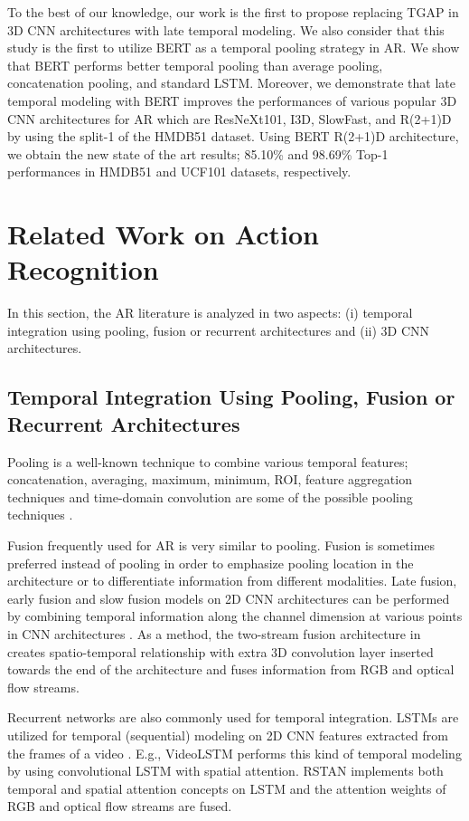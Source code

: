 \documentclass[runningheads]{llncs}
\begin{document}
To the best of our knowledge, our work is the first to propose replacing TGAP in 3D CNN architectures with late temporal modeling. We also consider that this study is the first to utilize BERT as a temporal pooling strategy in AR. We show that BERT performs better temporal pooling than average pooling, concatenation pooling, and standard LSTM. Moreover, we demonstrate that late temporal modeling with BERT improves the performances of various popular 3D CNN architectures for AR which are ResNeXt101, I3D, SlowFast, and R(2+1)D by using the split-1 of the HMDB51 dataset. Using BERT R(2+1)D architecture, we obtain the new state of the art results; 85.10\% and 98.69\% Top-1 performances in HMDB51 and UCF101 datasets, respectively. 
 \section{Related Work on Action Recognition}
In this section, the AR literature is analyzed in two aspects: (i) temporal integration using pooling, fusion or recurrent architectures and (ii) 3D CNN architectures. 
\label{sec:related_work}
\subsection{Temporal Integration Using Pooling, Fusion or Recurrent Architectures}
\label{sec:intro_latePool}
Pooling is a well-known technique to combine various temporal features; concatenation, averaging, maximum, minimum, ROI, feature aggregation techniques and time-domain convolution are some of the possible pooling techniques \cite{Girdhar2017,Ng2015}.

Fusion frequently used for AR is very similar to pooling. Fusion is sometimes preferred instead of pooling in order to emphasize pooling location in the architecture or to differentiate information from different modalities. Late fusion, early fusion and slow fusion models on 2D CNN architectures can be performed by combining temporal information along the channel dimension at various points in CNN architectures \cite{Karpathy2014}. As a method, the two-stream fusion architecture in \cite{Feichtenhofer2016} creates spatio-temporal relationship with extra 3D convolution layer inserted towards the end of the architecture and fuses information from RGB and optical flow streams.

Recurrent networks are also commonly used for temporal integration. LSTMs are utilized for temporal (sequential) modeling on 2D CNN features extracted from the frames of a video \cite{Ng2015,Donahue2017a}. E.g., VideoLSTM \cite{Li2018} performs this kind of temporal modeling by using convolutional LSTM with spatial attention. RSTAN \cite{Du2018} implements both temporal and spatial attention concepts on LSTM and the attention weights of RGB and optical flow streams are fused. 
\end{document}
